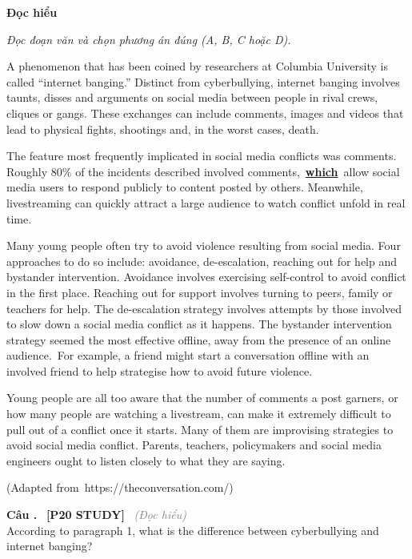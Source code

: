 \documentclass[12pt,a4paper,twoside]{article}
\newcounter{qcounter}
\newcommand{\question}[2][]{%
    \stepcounter{qcounter}%
    \par\vspace{6pt}%
    \noindent\textcolor{primaryBlue}{\textbf{Câu \theqcounter.}}~%
    \textcolor{secondaryBlue}{\small\textbf{[P20 STUDY]}}~%
    \if\relax\detokenize{#1}\relax\else\textcolor{gray}{\small\textit{(#1)}}~\fi\\[1pt]
    \noindent #2%
}
\newenvironment{readingpassage}[1][]{%
    \begin{tcolorbox}[enhanced, colback=grayLight, colframe=secondaryBlue,
        coltitle=textDark, fonttitle=\bfseries, title={#1},
        rounded corners, arc=3mm, boxrule=1pt,
        left=15pt, right=15pt, top=10pt, bottom=10pt,
        breakable, before skip=10pt, after skip=10pt, drop fuzzy shadow]
    \setstretch{1.3}
}{\end{tcolorbox}}
\begin{document}
\begin{groupbox}\textbf{\large Đọc hiểu}\end{groupbox}
\textit{Đọc đoạn văn và chọn phương án đúng (A, B, C hoặc D).}
\begin{readingpassage}[]
A phenomenon that has been coined by researchers at Columbia University is called “internet banging.” Distinct from cyberbullying, internet banging involves taunts, disses and arguments on social media between people in rival crews, cliques or gangs. These exchanges can include comments, images and videos that lead to physical fights, shootings and, in the worst cases, death.

The feature most frequently implicated in social media conflicts was comments. Roughly 80\% of the incidents described involved comments, \underline{\textbf{which}} allow social media users to respond publicly to content posted by others. Meanwhile, livestreaming can quickly attract a large audience to watch conflict unfold in real time.

Many young people often try to avoid violence resulting from social media. Four approaches to do so include: avoidance, de-escalation, reaching out for help and bystander intervention. Avoidance involves exercising self-control to avoid conflict in the first place. Reaching out for support involves turning to peers, family or teachers for help. The de-escalation strategy involves attempts by those involved to slow down a social media conflict as it happens. The bystander intervention strategy seemed the most effective offline, away from the presence of an online audience. For example, a friend might start a conversation offline with an involved friend to help strategise how to avoid future violence.

Young people are all too aware that the number of comments a post garners, or how many people are watching a livestream, can make it extremely difficult to pull out of a conflict once it starts. Many of them are improvising strategies to avoid social media conflict. Parents, teachers, policymakers and social media engineers ought to listen closely to what they are saying.

(Adapted from https://theconversation.com/)
\end{readingpassage}

\question[Đọc hiểu]{According to paragraph 1, what is the difference between cyberbullying and internet banging?}
\end{document}
